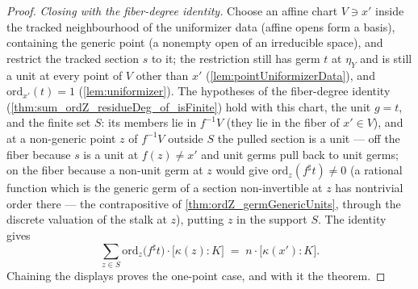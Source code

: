 \begin{proof}
  \emph{Closing with the fiber-degree identity.} Choose an affine chart
  \(V \ni x'\) inside the tracked neighbourhood of the uniformizer data (affine opens
  form a basis), containing the generic point (a nonempty open of an irreducible
  space), and restrict the tracked section \(s\) to it; the restriction still has germ
  \(t\) at \(\eta_Y\) and is still a unit at every point of \(V\) other than \(x'\)
  (\ref{lem:pointUniformizerData}), and \(\mathrm{ord}_{x'}(t) = 1\)
  (\ref{lem:uniformizer}). The hypotheses of the fiber-degree identity
  (\ref{thm:sum_ordZ_residueDeg_of_isFinite}) hold with this chart, the unit
  \(g = t\), and the finite set \(S\): its members lie in \(f^{-1}V\) (they lie in the
  fiber of \(x' \in V\)), and at a non-generic point \(z\) of \(f^{-1}V\) outside
  \(S\) the pulled section is a unit --- off the fiber because \(s\) is a unit at
  \(f(z) \neq x'\) and unit germs pull back to unit germs; on the fiber because a
  non-unit germ at \(z\) would give \(\mathrm{ord}_z(f^{\sharp}t) \neq 0\) (a rational
  function which is the generic germ of a section non-invertible at \(z\) has
  nontrivial order there --- the contrapositive of \ref{thm:ordZ_germGenericUnits},
  through the discrete valuation of the stalk at \(z\)), putting \(z\) in the support
  \(S\). The identity gives
  \[
    \sum_{z \in S} \mathrm{ord}_z\bigl(f^{\sharp}t\bigr) \cdot
      \bigl[\kappa(z) : K\bigr]
    \;=\; n \cdot \bigl[\kappa(x') : K\bigr].
  \]
  Chaining the displays proves the one-point case, and with it the theorem.
\end{proof}

